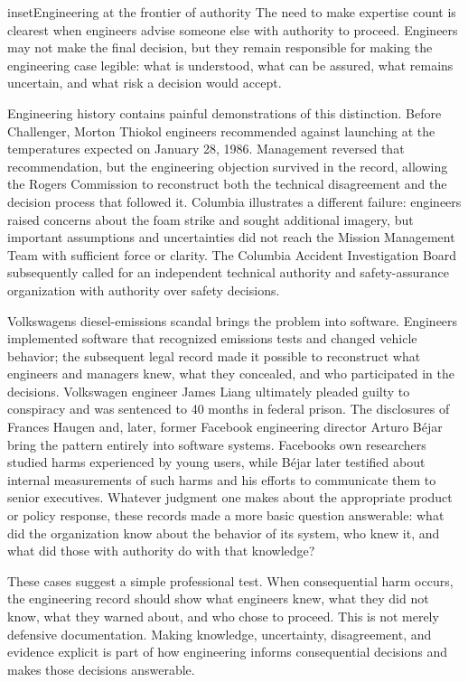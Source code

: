 \begin{bookbox}{inset}{Engineering at the frontier of authority}
\label{inset-frontier-authority}
The need to make expertise count is clearest when engineers advise someone else with authority to proceed. Engineers may not make the final decision, but they remain responsible for making the engineering case legible: what is understood, what can be assured, what remains uncertain, and what risk a decision would accept.

Engineering history contains painful demonstrations of this distinction. Before Challenger, Morton Thiokol engineers recommended against launching at the temperatures expected on January 28, 1986. Management reversed that recommendation, but the engineering objection survived in the record, allowing the Rogers Commission to reconstruct both the technical disagreement and the decision process that followed it\citep{rogers1986}. Columbia illustrates a different failure: engineers raised concerns about the foam strike and sought additional imagery, but important assumptions and uncertainties did not reach the Mission Management Team with sufficient force or clarity. The Columbia Accident Investigation Board subsequently called for an independent technical authority and safety-assurance organization with authority over safety decisions\citep{caib2003}.

Volkswagen\textquotesingle s diesel-emissions scandal brings the problem into software. Engineers implemented software that recognized emissions tests and changed vehicle behavior; the subsequent legal record made it possible to reconstruct what engineers and managers knew, what they concealed, and who participated in the decisions. Volkswagen engineer James Liang ultimately pleaded guilty to conspiracy and was sentenced to 40 months in federal prison\citep{doj-vw-liang}. The disclosures of Frances Haugen and, later, former Facebook engineering director Arturo Béjar bring the pattern entirely into software systems. Facebook\textquotesingle s own researchers studied harms experienced by young users, while Béjar later testified about internal measurements of such harms and his efforts to communicate them to senior executives\citep{senate-haugen2021, senate-bejar2023}. Whatever judgment one makes about the appropriate product or policy response, these records made a more basic question answerable: what did the organization know about the behavior of its system, who knew it, and what did those with authority do with that knowledge?

These cases suggest a simple professional test. When consequential harm occurs, the engineering record should show what engineers knew, what they did not know, what they warned about, and who chose to proceed. This is not merely defensive documentation. Making knowledge, uncertainty, disagreement, and evidence explicit is part of how engineering informs consequential decisions and makes those decisions answerable.


\end{bookbox}
